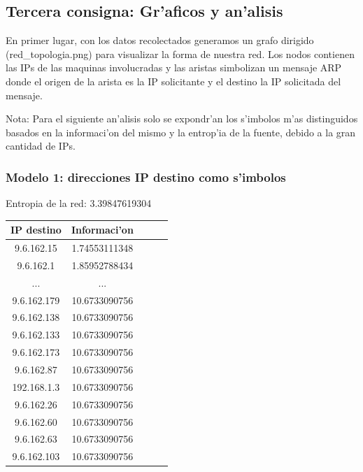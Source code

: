 \documentclass[a4paper,10pt]{article}
\begin{document}
\subsection{Tercera consigna: Gr'aficos y an'alisis}
\label{expli1:}

En primer lugar, con los datos recolectados generamos un grafo dirigido (red\_topologia.png) para visualizar la forma de nuestra red. Los nodos contienen las IPs de las maquinas involucradas y las aristas simbolizan un mensaje ARP donde el origen de la arista es la IP solicitante y el destino la IP solicitada del mensaje.

Nota: Para el siguiente an'alisis solo se expondr'an los s'imbolos m'as distinguidos basados en la informaci'on del mismo y la entrop'ia de la fuente, debido a la gran cantidad de IPs. \\

\subsubsection{Modelo 1: direcciones IP destino como s'imbolos}

Entropia de la red: 3.39847619304	\\

\noindent \begin{tabular}{| c | c | c | c | r} \hline
IP destino	&	Informaci'on	\\	\hline
9.6.162.15	 & 	1.74553111348	 \\ \hline 
9.6.162.1	 & 	1.85952788434	 \\ \hline 
...	&	...	\\ \hline
9.6.162.179	 & 	10.6733090756	 \\ \hline 
9.6.162.138	 & 	10.6733090756	 \\ \hline 
9.6.162.133	 & 	10.6733090756	 \\ \hline 
9.6.162.173	 & 	10.6733090756	 \\ \hline 
9.6.162.87	 & 	10.6733090756	 \\ \hline 
192.168.1.3	 & 	10.6733090756	 \\ \hline 
9.6.162.26	 & 	10.6733090756	 \\ \hline 
9.6.162.60	 & 	10.6733090756	 \\ \hline 
9.6.162.63	 & 	10.6733090756	 \\ \hline 
9.6.162.103	 & 	10.6733090756	 \\ \hline 
\end{tabular}

\newpage
\end{document}
